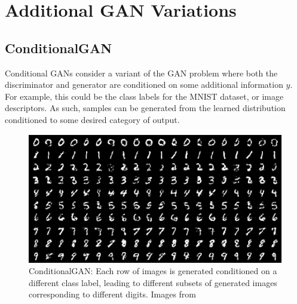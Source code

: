 \section{Additional GAN Variations}

\subsection{ConditionalGAN}
Conditional GANs \cite{mirza2014conditional} consider a variant of the GAN problem where both the discriminator and generator are conditioned on some additional information $y$. For example, this could be the class labels for the MNIST dataset, or image descriptors. As such, samples can be generated from the learned distribution conditioned to some desired category of output.
\begin{figure}[h]
\centering
  \includegraphics[scale=0.6]{chapter_14/files/conditionalgan.png}
  \caption{ConditionalGAN: Each row of images is generated conditioned on a different class label, leading to different subsets of generated images corresponding to different digits. Images from \cite{mirza2014conditional}}
\end{figure}

